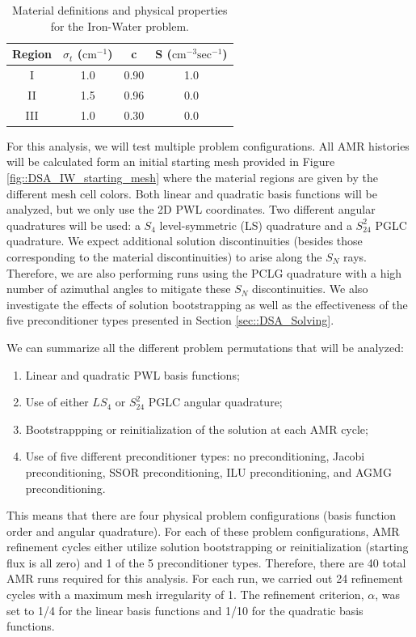 \begin{table}[hbt]
\caption{Material definitions and physical properties for the Iron-Water problem.}
\centering
\def\arraystretch{1.2}
\begin{tabular}{|c|c|c|c|}
\hline
Region & $\sigma_t$ ($\text{cm}^{-1}$) & c  & S ($\text{cm}^{-3} \text{sec}^{-1}$) \\
\hline
I & 1.0 & 0.90 & 1.0 \\
\hline
II & 1.5 & 0.96 & 0.0 \\
\hline
III & 1.0 & 0.30 & 0.0\\
\hline
\end{tabular}
\label{tab::DSA_IW_mats}
\end{table}

For this analysis, we will test multiple problem configurations. All AMR histories will be calculated form an initial starting mesh provided in Figure \ref{fig::DSA_IW_starting_mesh} where the material regions are given by the different mesh cell colors. Both linear and quadratic basis functions will be analyzed, but we only use the 2D PWL coordinates. Two different angular quadratures will be used: a $S_4$ level-symmetric (LS) quadrature and a $S_{24}^2$ PGLC quadrature. We expect additional solution discontinuities (besides those corresponding to the material discontinuities) to arise along the $S_N$ rays. Therefore, we are also performing runs using the PCLG quadrature with a high number of azimuthal angles to mitigate these $S_N$ discontinuities. We also investigate the effects of solution bootstrapping as well as the effectiveness of the five preconditioner types presented in Section \ref{sec::DSA_Solving}.

We can summarize all the different problem permutations that will be analyzed:

\begin{enumerate}
\item Linear and quadratic PWL basis functions;
\item Use of either $LS_4$ or $S_{24}^{2}$ PGLC angular quadrature;
\item Bootstrappping or reinitialization of the solution at each AMR cycle;
\item Use of five different preconditioner types: no preconditioning, Jacobi preconditioning, SSOR preconditioning, ILU preconditioning, and AGMG preconditioning.
\end{enumerate}

\noindent This means that there are four physical problem configurations (basis function order and angular quadrature). For each of these problem configurations, AMR refinement cycles either utilize solution bootstrapping or reinitialization (starting flux is all zero) and 1 of the 5 preconditioner types. Therefore, there are 40 total AMR runs required for this analysis. For each run, we carried out 24 refinement cycles with a maximum mesh irregularity of 1. The refinement criterion, $\alpha$, was set to 1/4 for the linear basis functions and 1/10 for the quadratic basis functions.

